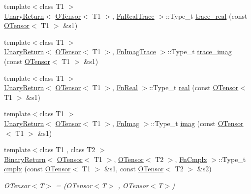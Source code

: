 \begin{DoxyCompactItemize}
\item 
{\footnotesize template$<$class T1 $>$ }\\\mbox{\hyperlink{structENSEM_1_1UnaryReturn}{Unary\+Return}}$<$ \mbox{\hyperlink{classENSEM_1_1OTensor}{O\+Tensor}}$<$ T1 $>$, \mbox{\hyperlink{structENSEM_1_1FnRealTrace}{Fn\+Real\+Trace}} $>$\+::Type\+\_\+t \mbox{\hyperlink{group__obstensor_ga540149a8c9955de22cf6c5562ec69f2f}{trace\+\_\+real}} (const \mbox{\hyperlink{classENSEM_1_1OTensor}{O\+Tensor}}$<$ T1 $>$ \&s1)
\item 
{\footnotesize template$<$class T1 $>$ }\\\mbox{\hyperlink{structENSEM_1_1UnaryReturn}{Unary\+Return}}$<$ \mbox{\hyperlink{classENSEM_1_1OTensor}{O\+Tensor}}$<$ T1 $>$, \mbox{\hyperlink{structENSEM_1_1FnImagTrace}{Fn\+Imag\+Trace}} $>$\+::Type\+\_\+t \mbox{\hyperlink{group__obstensor_gab134dab9b5acf4d2d372b22d17d4b307}{trace\+\_\+imag}} (const \mbox{\hyperlink{classENSEM_1_1OTensor}{O\+Tensor}}$<$ T1 $>$ \&s1)
\item 
{\footnotesize template$<$class T1 $>$ }\\\mbox{\hyperlink{structENSEM_1_1UnaryReturn}{Unary\+Return}}$<$ \mbox{\hyperlink{classENSEM_1_1OTensor}{O\+Tensor}}$<$ T1 $>$, \mbox{\hyperlink{structENSEM_1_1FnReal}{Fn\+Real}} $>$\+::Type\+\_\+t \mbox{\hyperlink{group__obstensor_ga6d95b4347a14db99d06a34a4aa52038b}{real}} (const \mbox{\hyperlink{classENSEM_1_1OTensor}{O\+Tensor}}$<$ T1 $>$ \&s1)
\item 
{\footnotesize template$<$class T1 $>$ }\\\mbox{\hyperlink{structENSEM_1_1UnaryReturn}{Unary\+Return}}$<$ \mbox{\hyperlink{classENSEM_1_1OTensor}{O\+Tensor}}$<$ T1 $>$, \mbox{\hyperlink{structENSEM_1_1FnImag}{Fn\+Imag}} $>$\+::Type\+\_\+t \mbox{\hyperlink{group__obstensor_ga8fd330e1f2838b575c200fc264a4d95b}{imag}} (const \mbox{\hyperlink{classENSEM_1_1OTensor}{O\+Tensor}}$<$ T1 $>$ \&s1)
\item 
{\footnotesize template$<$class T1 , class T2 $>$ }\\\mbox{\hyperlink{structENSEM_1_1BinaryReturn}{Binary\+Return}}$<$ \mbox{\hyperlink{classENSEM_1_1OTensor}{O\+Tensor}}$<$ T1 $>$, \mbox{\hyperlink{classENSEM_1_1OTensor}{O\+Tensor}}$<$ T2 $>$, \mbox{\hyperlink{structENSEM_1_1FnCmplx}{Fn\+Cmplx}} $>$\+::Type\+\_\+t \mbox{\hyperlink{group__obstensor_gaabe3804eba50d35ba93cf516f1e5a85b}{cmplx}} (const \mbox{\hyperlink{classENSEM_1_1OTensor}{O\+Tensor}}$<$ T1 $>$ \&s1, const \mbox{\hyperlink{classENSEM_1_1OTensor}{O\+Tensor}}$<$ T2 $>$ \&s2)
\begin{DoxyCompactList}\small\item\em O\+Tensor$<$\+T$>$ = (O\+Tensor$<$\+T$>$ , O\+Tensor$<$\+T$>$) \end{DoxyCompactList}\item 

\end{DoxyCompactItemize}
